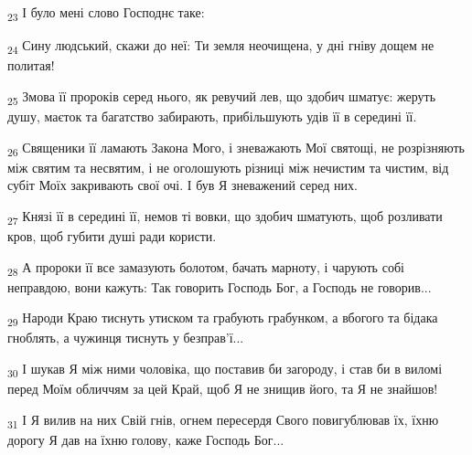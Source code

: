 \begin{tcolorbox}
\textsubscript{23} І було мені слово Господнє таке:
\end{tcolorbox}
\begin{tcolorbox}
\textsubscript{24} Сину людський, скажи до неї: Ти земля неочищена, у дні гніву дощем не политая!
\end{tcolorbox}
\begin{tcolorbox}
\textsubscript{25} Змова її пророків серед нього, як ревучий лев, що здобич шматує: жеруть душу, маєток та багатство забирають, прибільшують удів її в середині її.
\end{tcolorbox}
\begin{tcolorbox}
\textsubscript{26} Священики її ламають Закона Мого, і зневажають Мої святощі, не розрізняють між святим та несвятим, і не оголошують різниці між нечистим та чистим, від субіт Моїх закривають свої очі. І був Я зневажений серед них.
\end{tcolorbox}
\begin{tcolorbox}
\textsubscript{27} Князі її в середині її, немов ті вовки, що здобич шматують, щоб розливати кров, щоб губити душі ради користи.
\end{tcolorbox}
\begin{tcolorbox}
\textsubscript{28} А пророки її все замазують болотом, бачать марноту, і чарують собі неправдою, вони кажуть: Так говорить Господь Бог, а Господь не говорив...
\end{tcolorbox}
\begin{tcolorbox}
\textsubscript{29} Народи Краю тиснуть утиском та грабують грабунком, а вбогого та бідака гноблять, а чужинця тиснуть у безправ'ї...
\end{tcolorbox}
\begin{tcolorbox}
\textsubscript{30} І шукав Я між ними чоловіка, що поставив би загороду, і став би в виломі перед Моїм обличчям за цей Край, щоб Я не знищив його, та Я не знайшов!
\end{tcolorbox}
\begin{tcolorbox}
\textsubscript{31} І Я вилив на них Свій гнів, огнем пересердя Свого повигублював їх, їхню дорогу Я дав на їхню голову, каже Господь Бог...
\end{tcolorbox}
